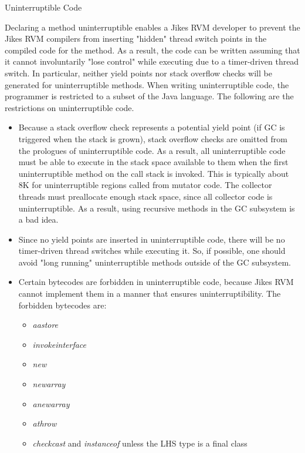 \begin{section}{Uninterruptible Code}
\label{sec:uninterruptiblecode}

Declaring a method uninterruptible enables a Jikes RVM developer to prevent the Jikes RVM compilers from inserting "hidden" thread switch points in the compiled code for the method. As a result, the code can be written assuming that it cannot involuntarily "lose control" while executing due to a timer-driven thread switch. In particular, neither yield points nor stack overflow checks will be generated for uninterruptible methods.
When writing uninterruptible code, the programmer is restricted to a subset of the Java language. The following are the restrictions on uninterruptible code.

\begin{itemize}
  \item Because a stack overflow check represents a potential yield point (if GC is triggered when the stack is grown), stack overflow checks are omitted from the prologues of uninterruptible code. As a result, all uninterruptible code must be able to execute in the stack space available to them when the first uninterruptible method on the call stack is invoked. This is typically about 8K for uninterruptible regions called from mutator code. The collector threads must preallocate enough stack space, since all collector code is uninterruptible. As a result, using recursive methods in the GC subsystem is a bad idea.
  \item Since no yield points are inserted in uninterruptible code, there will be no timer-driven thread switches while executing it. So, if possible, one should avoid "long running" uninterruptible methods outside of the GC subsystem.
  \item Certain bytecodes are forbidden in uninterruptible code, because Jikes RVM cannot implement them in a manner that ensures uninterruptibility. The forbidden bytecodes are:
    \begin{itemize}
      \item \textit{aastore}
      \item \textit{invokeinterface}
      \item \textit{new}
      \item \textit{newarray}
      \item \textit{anewarray}
      \item \textit{athrow}
      \item \textit{checkcast} and \textit{instanceof} unless the LHS type is a final class

\end{itemize}
\end{itemize}
\end{section}
